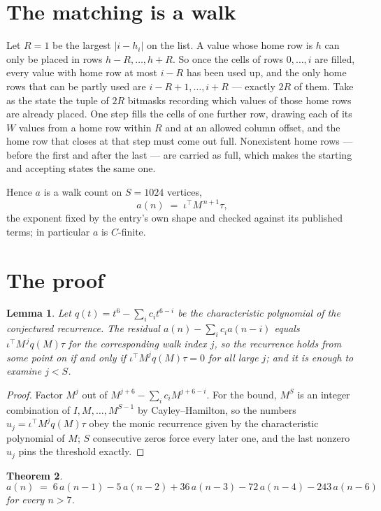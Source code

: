 \documentclass[11pt,a4paper]{article}
\theoremstyle{plain}
\newtheorem{theorem}{Theorem}
\newtheorem{lemma}[theorem]{Lemma}
\theoremstyle{definition}
\begin{document}
\section{The matching is a walk}

Let $R=1$ be the largest $|i-h_i|$ on the list. A value whose home row is $h$ can only be
placed in rows $h-R,\dots,h+R$. So once the cells of rows $0,\dots,i$ are filled, every
value with home row at most $i-R$ has been used up, and the only home rows that can be
partly used are $i-R+1,\dots,i+R$ --- exactly $2R$ of them. Take as the state the tuple of
$2R$ bitmasks recording which values of those home rows are already placed. One step fills
the cells of one further row, drawing each of its $W$ values from a home row within $R$
and at an allowed column offset, and the home row that closes at that step must come out
full. Nonexistent home rows --- before the first and after the last --- are carried as
full, which makes the starting and accepting states the same one.

Hence $a$ is a walk count on $S=1024$ vertices,
\[
a(n)\;=\;\iota^{\!\top}M^{\,n+1}\tau ,
\]
the exponent fixed by the entry's own shape and checked against its published terms; in
particular $a$ is $C$-finite.

\section{The proof}

\begin{lemma}\label{lem:crit}
Let $q(t)=t^{6}-\sum_i c_it^{6-i}$ be the characteristic polynomial of the
conjectured recurrence. The residual $a(n)-\sum_ic_ia(n-i)$ equals
$\iota^{\!\top}M^{\,j}q(M)\tau$ for the corresponding walk index $j$, so the recurrence
holds from some point on if and only if $\iota^{\!\top}M^{j}q(M)\tau=0$ for all large $j$;
and it is enough to examine $j<S$.
\end{lemma}

\begin{proof}
Factor $M^{j}$ out of $M^{j+6}-\sum_ic_iM^{j+6-i}$. For the bound, $M^{S}$
is an integer combination of $I,M,\dots,M^{S-1}$ by Cayley--Hamilton, so the numbers
$u_j=\iota^{\!\top}M^{j}q(M)\tau$ obey the monic recurrence given by the characteristic
polynomial of $M$; $S$ consecutive zeros force every later one, and the last nonzero $u_j$
pins the threshold exactly.
\end{proof}

\begin{theorem}
\[
a(n)\;=\;6\,a(n-1) - 5\,a(n-2) + 36\,a(n-3) - 72\,a(n-4) - 243\,a(n-6)
\]
for every $n>7$.
\end{theorem}
\end{document}
